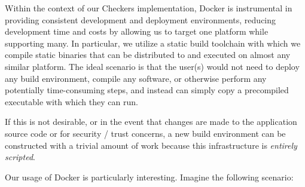 \documentclass[letterpaper]{article}
\begin{document}
Within the context of our Checkers implementation, Docker is
instrumental in providing consistent development and deployment
environments, reducing development time and costs by allowing us
to target one platform while supporting many. In particular, we
utilize a static build toolchain with which we compile static
binaries that can be distributed to and executed on almost any
similar platform. The ideal scenario is that the user(s) would
not need to deploy any build environment, compile any software,
or otherwise perform any potentially time-consuming steps, and
instead can simply copy a precompiled executable with which they
can run.

If this is not desirable, or in the event that changes are made
to the application source code or for security / trust concerns,
a new build environment can be constructed with a trivial amount
of work because this infrastructure is \emph{entirely scripted}.

Our usage of Docker is particularly interesting. Imagine the
following scenario:
\end{document}
